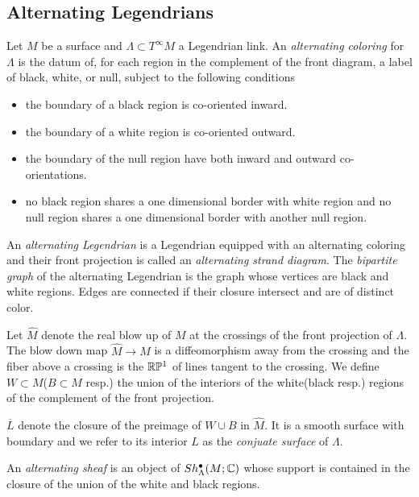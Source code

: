 \subsection*{Alternating Legendrians}
\begin{definition}
Let $M$ be a surface and $\Lambda \subset T^{\infty}M$ a Legendrian link. An \emph{alternating coloring} for $\Lambda$ is the datum of, for each region in the complement of the front diagram, a label of black, white, or null, subject to the following conditions
\begin{itemize}
\item the boundary of a black region is co-oriented inward.
\item the boundary of a white region is co-oriented outward.
\item the boundary of the null region have both inward and outward co-orientations.
\item no black region shares a one dimensional border with white region and no null region shares a one dimensional border with another null region.
\end{itemize}
An \emph{alternating Legendrian} is a Legendrian equipped with an alternating coloring and their front projection is called an \emph{alternating strand diagram}. The \emph{bipartite graph} of the alternating Legendrian is the graph whose vertices are black and white regions. Edges are connected if their closure intersect and are of distinct color.
\end{definition}
Let $\hat{M}$ denote the real blow up of $M$ at the crossings of the front projection of $\Lambda$. The blow down map $\hat{M}\rightarrow M$ is a diffeomorphism away from the crossing and the fiber above a crossing is the $\mathbb{R} \mathbb{P}^1$ of lines tangent to the crossing. We define $W\subset M$($B\subset M$ resp.) the union of the interiors of the white(black resp.) regions of the complement of the front projection.

\begin{definition}
$\overline{L}$ denote the closure of the preimage of $W\cup B$ in $\hat{M}$. It is a smooth surface with boundary and we refer to its interior $L$ as the \emph{conjuate surface} of $\Lambda$.
\end{definition}

\begin{definition}\label{altsh}
An \emph{alternating sheaf} is an object of $Sh^\bullet_\Lambda(M;\mathbb{C})$ whose support is contained in the closure of the union of the white and black regions.
\end{definition}


